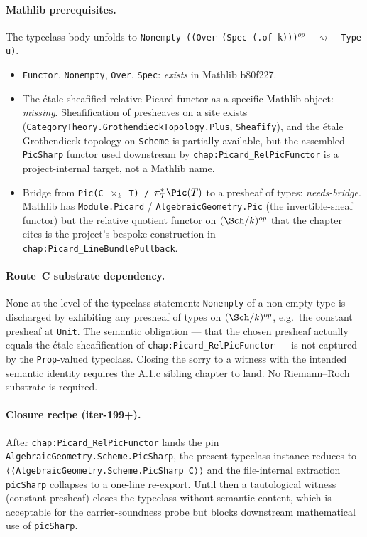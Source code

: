 \paragraph{Mathlib prerequisites.} The typeclass body unfolds to
\texttt{Nonempty ((Over (Spec (.of k)))${}^{op}$ \,$\rightsquigarrow$\, Type u)}.
\begin{itemize}
  \item \texttt{Functor}, \texttt{Nonempty}, \texttt{Over},
    \texttt{Spec}: \emph{exists} in Mathlib b80f227.
  \item The \'etale-sheafified relative Picard functor as a specific
    Mathlib object: \emph{missing}. Sheafification of presheaves on a
    site exists (\texttt{CategoryTheory.GrothendieckTopology.Plus},
    \texttt{Sheafify}), and the \'etale Grothendieck topology on
    \texttt{Scheme} is partially available, but the assembled
    \texttt{PicSharp} functor used downstream by
    \texttt{chap:Picard\_RelPicFunctor} is a project-internal target,
    not a Mathlib name.
  \item Bridge from \texttt{Pic(C ${}\times_k$ T) / $\pi_T^* \Pic(T)$}
    to a presheaf of types: \emph{needs-bridge}. Mathlib has
    \texttt{Module.Picard} / \texttt{AlgebraicGeometry.Pic} (the
    invertible-sheaf functor) but the relative quotient functor on
    $(\Sch/k)^{op}$ that the chapter cites is the project's bespoke
    construction in \texttt{chap:Picard\_LineBundlePullback}.
\end{itemize}

\paragraph{Route~C substrate dependency.} None at the level of the
typeclass statement: \texttt{Nonempty} of a non-empty type is
discharged by exhibiting any presheaf of types on
$(\Sch/k)^{op}$, e.g.\ the constant presheaf at \texttt{Unit}. The
semantic obligation --- that the chosen presheaf actually equals the
\'etale sheafification of \texttt{chap:Picard\_RelPicFunctor} --- is not
captured by the \texttt{Prop}-valued typeclass. Closing the sorry to a
witness with the intended semantic identity requires the A.1.c sibling
chapter to land. No Riemann--Roch substrate is required.

\paragraph{Closure recipe (iter-199+).} After
\texttt{chap:Picard\_RelPicFunctor} lands the pin
\texttt{AlgebraicGeometry.Scheme.PicSharp}, the present typeclass
instance reduces to \texttt{⟨⟨AlgebraicGeometry.Scheme.PicSharp C⟩⟩}
and the file-internal extraction \texttt{picSharp} collapses to a
one-line re-export. Until then a tautological witness (constant
presheaf) closes the typeclass without semantic content, which is
acceptable for the carrier-soundness probe but blocks downstream
mathematical use of \texttt{picSharp}.

